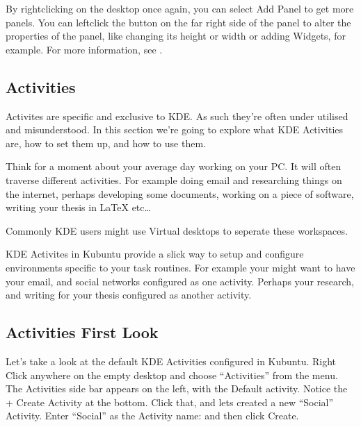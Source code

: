 \documentclass[letterpaper,10pt,english]{sphinxmanual}
\begin{document}
\sphinxAtStartPar
By right\sphinxhyphen{}clicking on the desktop once again, you can select Add Panel to get more panels. You can left\sphinxhyphen{}click the button on the far right side of the panel to alter the properties of the panel, like changing its height or width or adding Widgets, for example. For more information, see .


\subsection{Activities}
\label{\detokenize{docs/desktop-guide/advanced:activities}}
\sphinxAtStartPar
Activites are specific and exclusive to KDE. As such they’re often under utilised and misunderstood. In this section we’re going to explore what KDE Activities are, how to set them up, and how to use them.

\sphinxAtStartPar
Think for a moment about your average day working on your PC. It will often traverse different activities. For example doing email and researching things on the internet, perhaps developing some documents, working on a piece of software, writing your thesis in LaTeX etc…

\sphinxAtStartPar
Commonly KDE users might use Virtual desktops to seperate these workspaces.

\sphinxAtStartPar
KDE Activites in Kubuntu provide a slick way to setup and configure environments specific to your task routines. For example your might want to have your email, and social networks configured as one activity. Perhaps your research, and writing for your thesis configured as another activity.


\subsection{Activities First Look}
\label{\detokenize{docs/desktop-guide/advanced:activities-first-look}}

\sphinxAtStartPar
Let’s take a look at the default KDE Activities configured in Kubuntu. Right Click anywhere on the empty desktop and choose “Activities” from the menu. The Activities side bar appears on the left, with the Default activity. Notice the + Create Activity at the bottom. Click that, and lets created a new “Social” Activity.
Enter “Social” as the Activity name: and then click Create.
\end{document}
